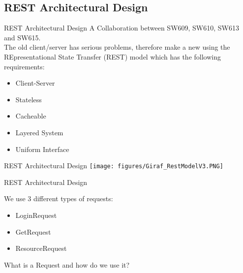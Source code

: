 \subsection{REST Architectural Design}
\begin{frame}{REST Architectural Design}
A Collaboration between SW609, SW610, SW613 and SW615.\\

The old client/server has serious problems, therefore make a new using the REpresentational State Transfer (REST) model which has the following requirements:
\begin{itemize}
\item Client-Server
\item Stateless
\item Cacheable
\item Layered System
\item Uniform Interface
\end{itemize}
\end{frame}

\begin{frame}{REST Architectural Design}
\texttt{[image: figures/Giraf\_RestModelV3.PNG]}
\end{frame}

\begin{frame}{REST Architectural Design}

We use 3 different types of requests:
\begin{itemize}
\item LoginRequest
\item GetRequest
\item ResourceRequest
\end{itemize}

What is a Request and how do we use it?

\end{frame}


